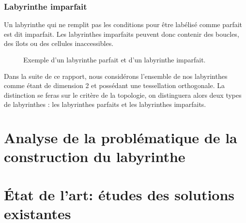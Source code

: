 \subsubsection{Labyrinthe imparfait}
Un labyrinthe qui ne remplit pas les conditions pour être labélisé comme parfait est dit imparfait. Les labyrinthes imparfaits peuvent donc contenir des boucles, des îlots ou des cellules inaccessibles.


\begin{figure}[htp] 
    \centering
    \hfill%
    \caption{Exemple d'un labyrinthe parfait et d'un labyrinthe imparfait.}
\end{figure}




Dans la suite de ce rapport, nous considérons l'ensemble de nos labyrinthes comme étant de dimension 2 et possédant une tessellation orthogonale. La distinction se feras sur le critère de la topologie, on distinguera alors deux types de labyrinthes : les labyrinthes parfaits et les labyrinthes imparfaits.
\section{Analyse de la problématique de la construction du labyrinthe}
\section{État de l’art: études des solutions existantes} \label{sec:etatDeLart2}

